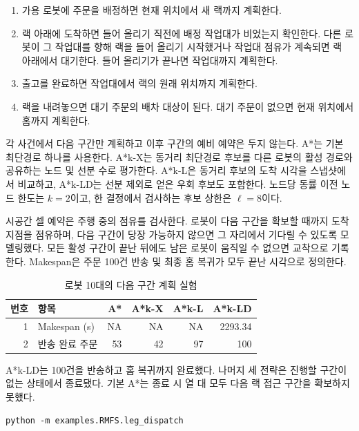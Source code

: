 \documentclass[11pt]{article}
\begin{document}
\begin{enumerate}
\item 가용 로봇에 주문을 배정하면 현재 위치에서 새 랙까지 계획한다.
\item 랙 아래에 도착하면 들어 올리기 직전에 배정 작업대가 비었는지 확인한다. 다른 로봇이 그 작업대를 향해 랙을 들어 올리기 시작했거나 작업대 점유가 계속되면 랙 아래에서 대기한다. 들어 올리기가 끝나면 작업대까지 계획한다.
\item 출고를 완료하면 작업대에서 랙의 원래 위치까지 계획한다.
\item 랙을 내려놓으면 대기 주문의 배차 대상이 된다. 대기 주문이 없으면 현재 위치에서 홈까지 계획한다.
\end{enumerate}

각 사건에서 다음 구간만 계획하고 이후 구간의 예비 예약은 두지 않는다. A*는 기본 최단경로 하나를 사용한다. A*k-X는 동거리 최단경로 후보를 다른 로봇의 활성 경로와 공유하는 노드 및 선분 수로 평가한다. A*k-L은 동거리 후보의 도착 시각을 스냅샷에서 비교하고, A*k-LD는 선분 제외로 얻은 우회 후보도 포함한다. 노드당 동률 이전 노드 한도는 $k=2$이고, 한 결정에서 검사하는 후보 상한은 $\ell=8$이다.

시공간 셀 예약은 주행 중의 점유를 검사한다. 로봇이 다음 구간을 확보할 때까지 도착 지점을 점유하며, 다음 구간이 당장 가능하지 않으면 그 자리에서 기다릴 수 있도록 모델링했다. 모든 활성 구간이 끝난 뒤에도 남은 로봇이 움직일 수 없으면 교착으로 기록한다. Makespan은 주문 100건 반송 및 최종 홈 복귀가 모두 끝난 시각으로 정의한다.

\begin{table}[htbp]
\centering
\caption{로봇 10대의 다음 구간 계획 실험}
\label{tab:next-leg-dispatch}
\begin{tabular}{rlrrrr}
\hline
번호 & 항목 & A* & A*k-X & A*k-L & A*k-LD\\
\hline
1 & Makespan (s) & NA & NA & NA & 2293.34\\
2 & 반송 완료 주문 & 53 & 42 & 97 & 100\\
\hline
\end{tabular}
\end{table}

A*k-LD는 100건을 반송하고 홈 복귀까지 완료했다. 나머지 세 전략은 진행할 구간이 없는 상태에서 종료됐다. 기본 A*는 종료 시 열 대 모두 다음 랙 접근 구간을 확보하지 못했다.

\begin{verbatim}
python -m examples.RMFS.leg_dispatch
\end{verbatim}
\end{document}
